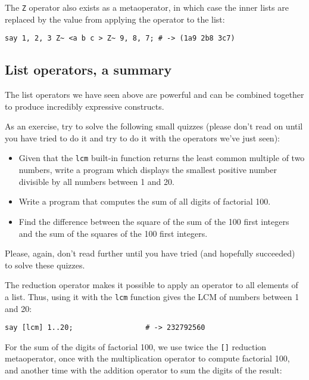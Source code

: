 The \verb'Z' operator also exists as a metaoperator, in 
which case the inner lists are replaced by the value 
from applying the operator to the list:

\begin{verbatim}
say 1, 2, 3 Z~ <a b c > Z~ 9, 8, 7; # -> (1a9 2b8 3c7)
\end{verbatim}

\subsection{List operators, a summary}

The list operators we have seen above are powerful 
and can be combined together to produce incredibly 
expressive constructs.

As an exercise, try to solve the following small 
quizzes (please don't read on until you have tried 
to do it and try to do it with the operators we've 
just seen):

\begin{itemize}
\item Given that the {\tt lcm} built-in function 
returns the least common multiple of two numbers, 
write a program which displays the smallest positive 
number divisible by all numbers between 1 and 20.

\item Write a program that computes the sum of all 
digits of factorial 100.

\item Find the difference between the square of the sum 
of the 100 first integers and the sum of the squares of 
the 100 first integers.
\end{itemize}

Please, again, don't read further until you have tried 
(and hopefully succeeded) to solve these quizzes.

The reduction operator makes it possible to apply an 
operator to all elements of a list. Thus, using it 
with the {\tt lcm} function gives the LCM of numbers 
between 1 and 20:

\begin{verbatim}
say [lcm] 1..20;                 # -> 232792560
\end{verbatim}

For the sum of the digits of factorial 100, we use 
twice the \verb'[]' reduction metaoperator, once with 
the multiplication operator to compute factorial 100, 
and another time with the addition operator to sum 
the digits of the result:

